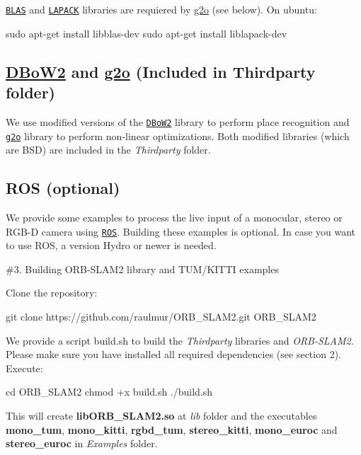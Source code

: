 \href{http://www.netlib.org/blas}{\tt B\+L\+AS} and \href{http://www.netlib.org/lapack}{\tt L\+A\+P\+A\+CK} libraries are requiered by \mbox{\hyperlink{namespaceg2o}{g2o}} (see below). On ubuntu\+: 
\begin{DoxyCode}
sudo apt-get install libblas-dev
sudo apt-get install liblapack-dev
\end{DoxyCode}


\subsection*{\mbox{\hyperlink{namespace_d_bo_w2}{D\+Bo\+W2}} and \mbox{\hyperlink{namespaceg2o}{g2o}} (Included in Thirdparty folder)}

We use modified versions of the \href{https://github.com/dorian3d/DBoW2}{\tt D\+Bo\+W2} library to perform place recognition and \href{https://github.com/RainerKuemmerle/g2o}{\tt g2o} library to perform non-\/linear optimizations. Both modified libraries (which are B\+SD) are included in the {\itshape Thirdparty} folder.

\subsection*{R\+OS (optional)}

We provide some examples to process the live input of a monocular, stereo or R\+G\+B-\/D camera using \href{ros.org}{\tt R\+OS}. Building these examples is optional. In case you want to use R\+OS, a version Hydro or newer is needed.

\#3. Building O\+R\+B-\/\+S\+L\+A\+M2 library and T\+U\+M/\+K\+I\+T\+TI examples

Clone the repository\+: 
\begin{DoxyCode}
git clone https://github.com/raulmur/ORB\_SLAM2.git ORB\_SLAM2
\end{DoxyCode}


We provide a script {\ttfamily build.\+sh} to build the {\itshape Thirdparty} libraries and {\itshape O\+R\+B-\/\+S\+L\+A\+M2}. Please make sure you have installed all required dependencies (see section 2). Execute\+: 
\begin{DoxyCode}
cd ORB\_SLAM2
chmod +x build.sh
./build.sh
\end{DoxyCode}


This will create {\bfseries lib\+O\+R\+B\+\_\+\+S\+L\+A\+M2.\+so} at {\itshape lib} folder and the executables {\bfseries mono\+\_\+tum}, {\bfseries mono\+\_\+kitti}, {\bfseries rgbd\+\_\+tum}, {\bfseries stereo\+\_\+kitti}, {\bfseries mono\+\_\+euroc} and {\bfseries stereo\+\_\+euroc} in {\itshape Examples} folder.

